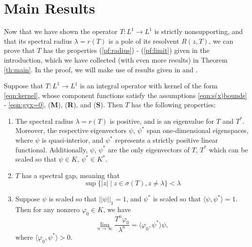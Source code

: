 \section{Main Results} \label{section:mainresults}

Now that we have shown the operator $T:L^1 \to L^1$ is strictly nonsupporting, and that its spectral radius $\lambda = r(T)$ is a pole of its resolvent $R(z, T)$, we can prove that $T$ has the properties (\ref{pf:radius}) - (\ref{pf:limit}) given in the introduction, which we have collected (with even more results) in Theorem \ref{th:main}. In the proof, we will make use of results given in \cite{Marek1970} and \cite{Sawashima1964}.

\begin{theorem} \label{th:main}
	Suppose that $T:L^1 \to L^1$ is an integral operator with kernel of the form \eqref{eqn:kernel}, whose component functions satisfy the assumptions \eqref{eqn:s(x)bounds} - \eqref{eqn:gyx=0}, 
	(\textbf{M}), (\textbf{R}), and (\textbf{S}). Then $T$ has the following properties:
	\begin{enumerate}
		\item The spectral radius $\lambda = r(T)$ is positive, and is an eigenvalue for $T$ and $T^*$. Moreover, the respective eigenvectors $\psi$, $\psi^*$ span one-dimensional eigenspaces, where $\psi$ is quasi-interior, and $\psi^*$ represents a strictly positive linear functional. Additionally, $\psi$, $\psi^*$ are the only eigenvectors of $T$, $T^*$ which can be scaled so that $\psi \in K$, $\psi^* \in K^*$.
		\item $T$ has a spectral gap, meaning that
		\[\sup\{ |z| \mid z \in \sigma(T), z \neq \lambda\} < \lambda\]
		\item Suppose $\psi$ is scaled so that $||\psi||_1 = 1$, and $\psi^*$ is scaled so that $\langle \psi, \psi^* \rangle = 1$. Then for any nonzero $\varphi_0 \in K$, we have
		\[\lim_{n \to \infty} \frac{T^n \varphi_0}{\lambda^n} = \langle \varphi_0, \psi^* \rangle \psi,\]
		where $\langle \varphi_0, \psi^* \rangle > 0$.
	\end{enumerate}
\end{theorem}

